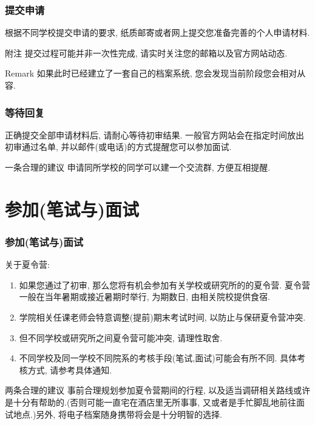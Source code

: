\documentclass[usenames,dvipsnames]{beamer}
\begin{document}
    \begin{frame}
      \frametitle{提交申请}
      根据不同学校提交申请的要求, 纸质邮寄或者网上提交您准备完善的个人申请材料.
      \begin{block}{附注}
        提交过程可能并非一次性完成, 请实时关注您的邮箱以及官方网站动态.
      \end{block}
      \begin{block}{Remark}
        如果此时已经建立了一套自己的档案系统, 您会发现当前阶段您会相对从容.
      \end{block}
    \end{frame}

    \begin{frame}
      \frametitle{等待回复}
        正确提交全部申请材料后, 请耐心等待初审结果. 一般官方网站会在指定时间放出初审通过名单, 并以邮件(或电话)的方式提醒您可以参加面试.
      \begin{block}{一条合理的建议}
        申请同所学校的同学可以建一个交流群, 方便互相提醒.  
      \end{block}
    \end{frame}

    \section{参加(笔试与)面试} 
    
    \begin{frame}
      \frametitle{参加(笔试与)面试}
      关于夏令营:
      \begin{enumerate}[label=--]
        \item 如果您通过了初审, 那么您将有机会参加有关学校或研究所的的夏令营. 夏令营一般在当年暑期或接近暑期时举行, 为期数日, 由相关院校提供食宿.
        \item 学院相关任课老师会特意调整(提前)期末考试时间, 以防止与保研夏令营冲突.
        \item 但不同学校或研究所之间夏令营可能冲突, 请理性取舍.
        \item 不同学校及同一学校不同院系的考核手段(笔试,面试)可能会有所不同. 具体考核方式, 请参考具体通知.
      \end{enumerate}
      \begin{block}{两条合理的建议}
        \small
        事前合理规划参加夏令营期间的行程, 以及适当调研相关路线或许是十分有帮助的.(否则可能一直宅在酒店里无所事事, 又或者是手忙脚乱地前往面试地点.)另外, 将电子档案随身携带将会是十分明智的选择.
      \end{block}
    \end{frame}
\end{document}
